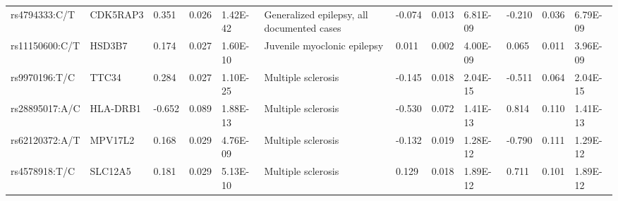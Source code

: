 \begin{table}[]
{\begin{tabular}{llllllllllll}
		\rowcolor[HTML]{BEBEBE}rs4794333:C/T                    & CDK5RAP3                          & 0.351                             & 0.026                           & 1.42E-42                       & Generalized epilepsy, all documented cases & -0.074                            & 0.013                           & 6.81E-09                       & -0.210                          & 0.036                           & 6.79E-09                       \\
		\rowcolor[HTML]{E0E0E0}rs11150600:C/T                   & HSD3B7                            & 0.174                             & 0.027                           & 1.60E-10                       & Juvenile myoclonic epilepsy                & 0.011                             & 0.002                           & 4.00E-09                       & 0.065                           & 0.011                           & 3.96E-09                       \\
		\rowcolor[HTML]{BEBEBE}rs9970196:T/C                    & TTC34                             & 0.284                             & 0.027                           & 1.10E-25                       & Multiple sclerosis                         & -0.145                            & 0.018                           & 2.04E-15                       & -0.511                          & 0.064                           & 2.04E-15                       \\
		\rowcolor[HTML]{BEBEBE}rs28895017:A/C                   & HLA-DRB1                          & -0.652                            & 0.089                           & 1.88E-13                       & Multiple sclerosis                         & -0.530                            & 0.072                           & 1.41E-13                       & 0.814                           & 0.110                           & 1.41E-13                       \\
		\rowcolor[HTML]{BEBEBE}rs62120372:A/T                   & MPV17L2                           & 0.168                             & 0.029                           & 4.76E-09                       & Multiple sclerosis                         & -0.132                            & 0.019                           & 1.28E-12                       & -0.790                          & 0.111                           & 1.29E-12                       \\
		\rowcolor[HTML]{BEBEBE}rs4578918:T/C                    & SLC12A5                           & 0.181                             & 0.029                           & 5.13E-10                       & Multiple sclerosis                         & 0.129                             & 0.018                           & 1.89E-12                       & 0.711                           & 0.101                           & 1.89E-12                       \\

\end{tabular}}
\end{table}
